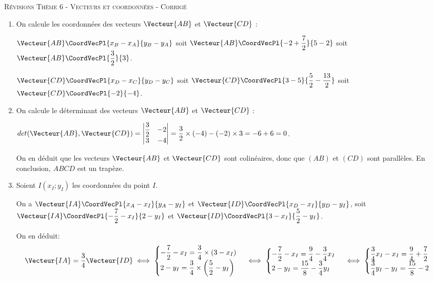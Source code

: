\documentclass[a4paper]{article}
\begin{document}
    \pagebreak



  \begin{center}
    {\scshape\LARGE Révisions Thème 6 - Vecteurs et coordonnées - Corrigé\par}
    \vspace{0.5cm}
  \end{center}

  \setcounter{exercice}{0}

  \begin{exercice}{}{}
    \begin{enumerate}
      \item On calcule les coordonnées des vecteurs $\Vecteur{AB}$ et $\Vecteur{CD}$ :
      
      $\Vecteur{AB}\CoordVecPl{x_B-x_A}{y_B-y_A}$ soit $\Vecteur{AB}\CoordVecPl{-2+\dfrac{7}{2}}{5-2}$ soit $\Vecteur{AB}\CoordVecPl{\dfrac{3}{2}}{3}$.

      $\Vecteur{CD}\CoordVecPl{x_D-x_C}{y_D-y_C}$ soit $\Vecteur{CD}\CoordVecPl{3-5}{\dfrac{5}{2}-\dfrac{13}{2}}$ soit $\Vecteur{CD}\CoordVecPl{-2}{-4}$.

      \item On calcule le déterminant des vecteurs $\Vecteur{AB}$ et $\Vecteur{CD}$ :
      
      $det(\Vecteur{AB},\Vecteur{CD})=\begin{vmatrix}
        \dfrac{3}{2} & -2\\
        3 & -4
      \end{vmatrix} = \dfrac{3}{2} \times (-4) - (-2) \times 3 = -6 + 6 = 0$.

      On en déduit que les vecteurs $\Vecteur{AB}$ et $\Vecteur{CD}$ sont colinéaires, donc que $(AB)$ et $(CD)$ sont parallèles. En conclusion, $ABCD$ est un trapèze.

      \item Soient $I(x_I;y_I)$ les coordonnées du point $I$.
      
      On a $\Vecteur{IA}\CoordVecPl{x_A-x_I}{y_A-y_I}$ et $\Vecteur{ID}\CoordVecPl{x_D-x_I}{y_D-y_I}$, soit $\Vecteur{IA}\CoordVecPl{-\dfrac{7}{2}-x_I}{2-y_I}$ et $\Vecteur{ID}\CoordVecPl{3-x_I}{\dfrac{5}{2}-y_I}$.
      
      
      On en déduit:
      $$\Vecteur{IA} = \dfrac{3}{4} \Vecteur{ID} \iff \begin{cases}
        -\dfrac{7}{2}-x_I = \dfrac{3}{4} \times (3-x_I)\\
        2-y_I = \dfrac{3}{4} \times \left(\dfrac{5}{2}-y_I\right)
      \end{cases} \iff \begin{cases}
        -\dfrac{7}{2}-x_I = \dfrac{9}{4}-\dfrac{3}{4}x_I\\
        2-y_I = \dfrac{15}{8}-\dfrac{3}{4}y_I
      \end{cases} \iff \begin{cases}
        \dfrac{3}{4}x_I-x_I=\dfrac{9}{4}+\dfrac{7}{2}\\
        \dfrac{3}{4}y_I-y_I=\dfrac{15}{8}-2
      \end{cases} $$
      

\end{enumerate}
\end{exercice}
\end{document}
